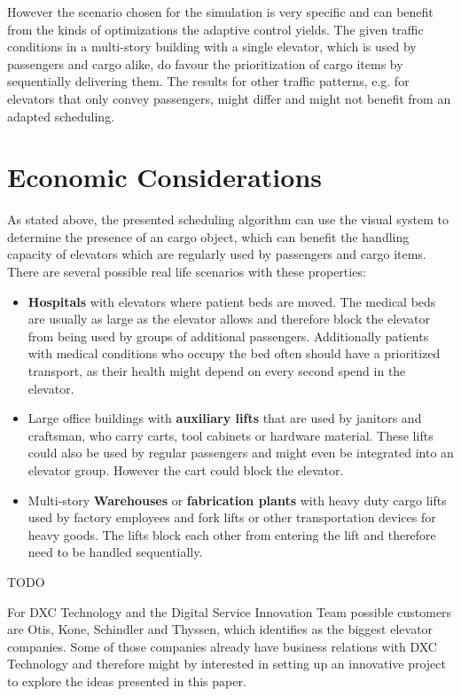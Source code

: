 However the scenario chosen for the simulation is very specific and can benefit from the kinds of optimizations the adaptive control yields. 
The given traffic conditions in a multi-story building with a single elevator, 
which is used by passengers and cargo alike, 
do favour the prioritization of cargo items by sequentially delivering them.
The results for other traffic patterns, e.g. for elevators that only convey passengers,
might differ and might not benefit from an adapted scheduling.

\section{Economic Considerations}
As stated above, the presented scheduling algorithm can use the visual system to determine the presence of an cargo object, which can benefit the handling capacity of elevators which are regularly used by passengers and cargo items.
There are several possible real life scenarios with these properties:
\begin{itemize}
    \item \textbf{Hospitals} with elevators where patient beds are moved. The medical beds are usually as large as the elevator allows and therefore block the elevator from being used by groups of additional passengers. Additionally patients with medical conditions who occupy the bed often should have a prioritized transport, as their health might depend on every second spend in the elevator. 
    \item Large office buildings with \textbf{auxiliary lifts} that are used by janitors and craftsman, who carry carts, tool cabinets or hardware material. These lifts could also be used by regular passengers and might even be integrated into an elevator group. However the cart could block the elevator.
    \item Multi-story \textbf{Warehouses} or \textbf{fabrication plants} with heavy duty cargo lifts used 
    by factory employees and fork lifts or other transportation devices for heavy goods. The lifts block each other from entering the lift and therefore need to be handled sequentially. 
\end{itemize}




TODO

For DXC Technology and the Digital Service Innovation Team possible customers are Otis, Kone, Schindler and Thyssen, which \textcite[][p.~4]{unger2015aufzuege} identifies as the biggest elevator companies. Some of those companies already have business relations with DXC Technology and therefore might by interested in setting up an innovative project to explore the ideas presented in this paper.

